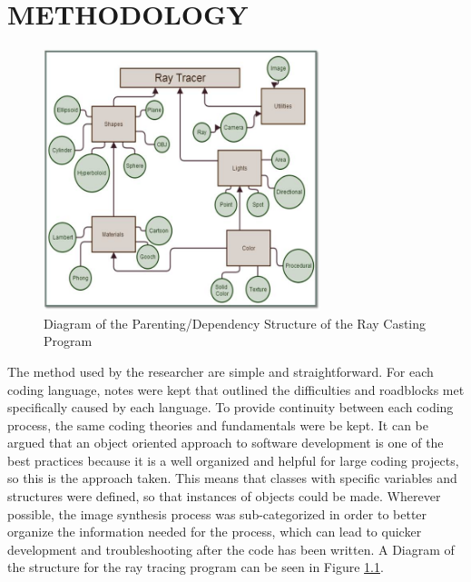 %
%
%


\chapter{\uppercase {Methodology}}
\begin{figure}[ht]
\centering
\includegraphics[height=3.0in]{figures/rayTracerStructure.jpg}
\caption{Diagram of the Parenting/Dependency Structure of the Ray Casting Program}
\label{fig:RayTracerDependencies}
\end{figure}

The method used by the researcher are simple and straightforward.  For each coding language, notes were kept that outlined the difficulties and roadblocks met specifically caused by each language.  To provide continuity between each coding process, the same coding theories and fundamentals were be kept.  It can be argued that an object oriented approach to software development is one of the best practices because it is a well organized and helpful for large coding projects, so this is the approach taken.  This means that classes with specific variables and structures were defined, so that instances of objects could be made.  Wherever possible, the image synthesis process was sub-categorized in order to better organize the information needed for the process, which can lead to quicker development and troubleshooting after the code has been written. A Diagram of the structure for the ray tracing program can be seen in Figure \ref{fig:RayTracerDependencies}.


